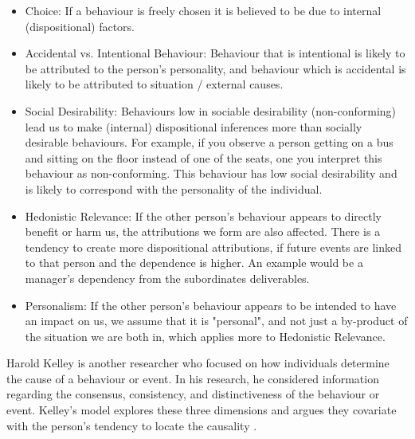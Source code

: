 \begin{itemize}
\item Choice: If a behaviour is freely chosen it is believed to be due to internal (dispositional) factors.
\item Accidental vs.  Intentional Behaviour: Behaviour that is intentional is likely to be attributed to the person’s personality, and behaviour which is accidental is likely to be attributed to situation / external causes.
\item Social Desirability: Behaviours low in sociable desirability (non-conforming) lead us to make (internal) dispositional inferences more than socially desirable behaviours.  For example, if you observe a person getting on a bus and sitting on the floor instead of one of the seats, one you interpret this behaviour as non-conforming. This behaviour has low social desirability and is likely to correspond with the personality of the individual.
\item Hedonistic Relevance: If the other person's behaviour appears to directly benefit or harm us,  the attributions we form are also affected. There is a tendency to create more dispositional attributions,  if future events are linked to that person and the dependence is higher.  An example would be a manager's dependency from the subordinates deliverables.
\item Personalism: If the other person's behaviour appears to be intended to have an impact on us, we assume that it is "personal", and not just a by-product of the situation we are both in, which applies more to Hedonistic Relevance.
\end{itemize}



Harold Kelley is another researcher who focused on how individuals determine the cause of a behaviour or event.  In his research, he considered information regarding the consensus, consistency,  and distinctiveness of the behaviour or event. Kelley’s model explores these three dimensions and argues they covariate with the person's tendency  to locate the causality \cite{Kelley1967}. 

